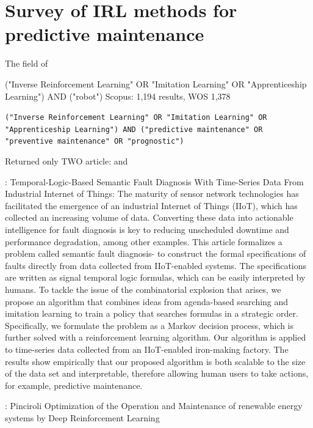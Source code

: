 \documentclass{article}
\begin{document}
\par


\section{Survey of IRL methods for predictive maintenance}

The field of 

("Inverse Reinforcement Learning" OR "Imitation Learning" OR "Apprenticeship Learning") AND ("robot") Scopus: 1,194  results, WOS 1,378



\texttt{("Inverse Reinforcement Learning" OR "Imitation Learning" OR "Apprenticeship Learning") AND ("predictive maintenance" OR "preventive maintenance" OR "prognostic")}

Returned only TWO article: \cite{Chen-2021-Temporal} and \cite{Pinciroli2022-752} 	

\cite{Chen-2021-Temporal}: Temporal-Logic-Based Semantic Fault Diagnosis With Time-Series Data From Industrial Internet of Things:
The maturity of sensor network technologies has facilitated the emergence of an industrial Internet of Things (IIoT), which has collected an increasing volume of data. Converting these data into actionable intelligence for fault diagnosis is key to reducing unscheduled downtime and performance degradation, among other examples. This article formalizes a problem called semantic fault diagnosis- to construct the formal specifications of faults directly from data collected from IIoT-enabled systems. The specifications are written as signal temporal logic formulas, which can be easily interpreted by humans. To tackle the issue of the combinatorial explosion that arises, we propose an algorithm that combines ideas from agenda-based searching and imitation learning to train a policy that searches formulas in a strategic order. Specifically, we formulate the problem as a Markov decision process, which is further solved with a reinforcement learning algorithm. Our algorithm is applied to time-series data collected from an IIoT-enabled iron-making factory. The results show empirically that our proposed algorithm is both scalable to the size of the data set and interpretable, therefore allowing human users to take actions, for example, predictive maintenance.

\cite{Pinciroli2022-752}: Pinciroli Optimization of the Operation and Maintenance of renewable energy systems by Deep Reinforcement Learning
\end{document}
